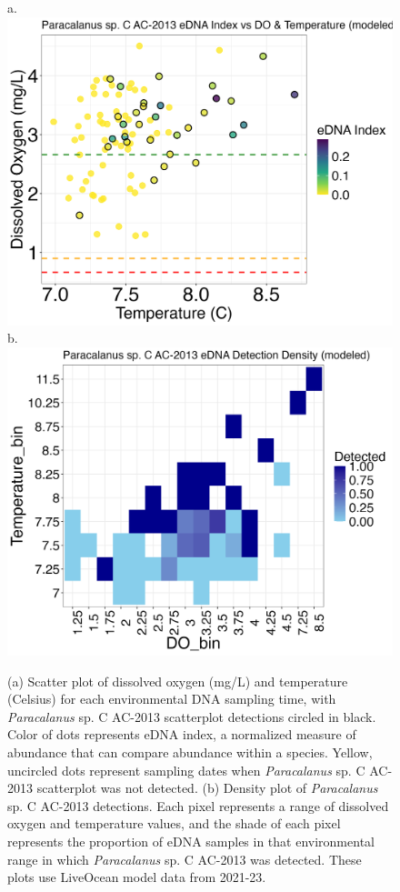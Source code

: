 \documentclass[12pt,twoside]{reedthesis}
\begin{document}
	
	\begin{figure}[!h]
		\begin{center}
			a. \includegraphics[scale=0.3]{Paracalanus_Scatter_AllYr_mod_noOut} 
			b. \includegraphics[scale=0.3]{Paracalanus_Density_AllYr_mod} 
			\caption[\textit{Paracalanus} sp. C AC-2013 scatterplot]{\footnotesize{(a) Scatter plot of dissolved oxygen (mg/L) and temperature (Celsius) for each environmental DNA sampling time, with \textit{Paracalanus} sp. C AC-2013 scatterplot detections circled in black. Color of dots represents eDNA index, a normalized measure of abundance that can compare abundance within a species. Yellow, uncircled dots represent sampling dates when \textit{Paracalanus} sp. C AC-2013 scatterplot was not detected. (b) Density plot of \textit{Paracalanus} sp. C AC-2013 detections. Each pixel represents a range of dissolved oxygen and temperature values, and the shade of each pixel represents the proportion of eDNA samples in that environmental range in which \textit{Paracalanus} sp. C AC-2013 was detected. These plots use LiveOcean model data from 2021-23.}} %
			\label{ParacalanusScatter}
		\end{center}
	\end{figure} 
	
\end{document}
